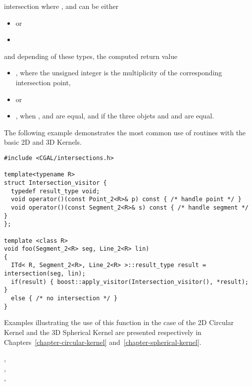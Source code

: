\begin{ccRefFunction}{intersection}
where ,  and 
can be either
\begin{itemize}
\item {}  or
\item {} 
\end{itemize}

and depending of these types, the computed return value 
\begin{itemize}
\item {} ,
where the unsigned integer is the multiplicity of the corresponding
intersection point,
\item {}  or
\item {} , when ,  and 
 are equal, and if the three objets  and  
and  are equal.
\end{itemize} 

\ccExample

The following example demonstrates the most common use of 
 routines with the basic 2D and 3D Kernels.
\ccHtmlLinksOff%
\begin{verbatim}
#include <CGAL/intersections.h>

template<typename R>
struct Intersection_visitor {
  typedef result_type void;
  void operator()(const Point_2<R>& p) const { /* handle point */ }
  void operator()(const Segment_2<R>& s) const { /* handle segment */ }
};

template <class R>
void foo(Segment_2<R> seg, Line_2<R> lin)
{
  ITd< R, Segment_2<R>, Line_2<R> >::result_type result = intersection(seg, lin);
  if(result) { boost::apply_visitor(Intersection_visitor(), *result); } 
  else { /* no intersection */ }
}
\end{verbatim}%
\ccHtmlLinksOn%

Examples illustrating the use of this function in the case of the 2D
Circular Kernel and the 3D Spherical Kernel are presented respectively
in Chapters~\ref{chapter-circular-kernel}
and~\ref{chapter-spherical-kernel}.

\ccSeeAlso
{}, \\
, \\ 
, \\

\end{ccRefFunction}

